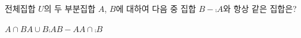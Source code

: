 전체집합 $U$의 두 부분집합 $A$, $B$에 대하여 다음 중 집합 $B-\comp{A}$와 항상 같은 집합은?
\begin{choices32}{$A\cap B$}{$A\cup B$}{$\comp{A}$}{$B-A$}{$A\cap\comp{B}$}\end{choices32}
